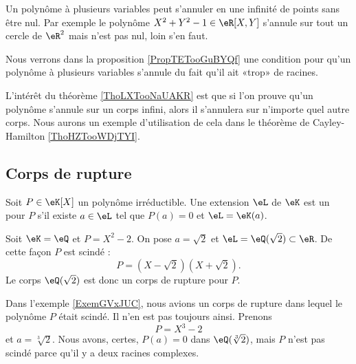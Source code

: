 \begin{example}\label{ExGRHooBNpjSP}
    Un polynôme à plusieurs variables peut s'annuler en une infinité de points sans être nul. Par exemple le polynôme \( X^2+Y^2-1\in\eR[X,Y]\) s'annule sur tout un cercle de \( \eR^2\) mais n'est pas nul, loin s'en faut.

    Nous verrons dans la proposition \ref{PropTETooGuBYQf} une condition pour qu'un polynôme à plusieurs variables s'annule du fait qu'il ait «trop» de racines.
\end{example}

\begin{remark}
    L'intérêt du théorème \ref{ThoLXTooNaUAKR} est que si l'on prouve qu'un polynôme s'annule sur un corps infini, alors il s'annulera sur n'importe quel autre corps. Nous aurons un exemple d'utilisation de cela dans le théorème de Cayley-Hamilton \ref{ThoHZTooWDjTYI}.
\end{remark}

\subsection{Corps de rupture}

\begin{definition}
    Soit \( P\in\eK[X]\) un polynôme irréductible. Une extension \( \eL\) de \( \eK\) est un  pour \( P\) s'il existe \( a\in \eL\) tel que \( P(a)=0\) et \( \eL=\eK(a)\).
\end{definition}

\begin{example}     \label{ExemGVxJUC}
    Soit \( \eK=\eQ\) et \( P=X^2-2\). On pose \( a=\sqrt{2}\) et \( \eL=\eQ(\sqrt{2})\subset\eR\). De cette façon \( P\) est scindé :
    \begin{equation}
        P=(X-\sqrt{2})(X+\sqrt{2}).
    \end{equation}
    Le corps \( \eQ(\sqrt{2})\) est donc un corps de rupture pour \( P\).
\end{example}

\begin{example}
    Dans l'exemple \ref{ExemGVxJUC}, nous avions un corps de rupture dans lequel le polynôme \( P\) était scindé. Il n'en est pas toujours ainsi. Prenons 
    \begin{equation}
        P=X^3-2
    \end{equation}
    et \( a=\sqrt[3]{2}\). Nous avons, certes, \( P(a)=0\) dans \( \eQ(\sqrt[3]{2})\), mais \( P\) n'est pas scindé parce qu'il y a deux racines complexes.
\end{example}

